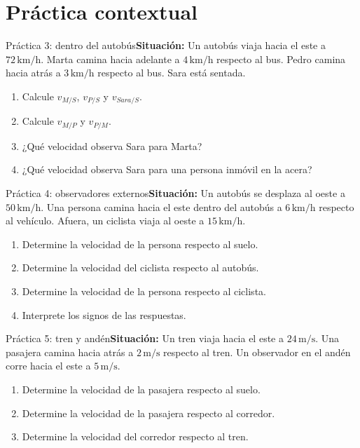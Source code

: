 \documentclass[aspectratio=169,10pt]{beamer}
\begin{document}
\section{Práctica contextual}
\begin{frame}{Práctica 3: dentro del autobús}\textbf{Situación:} Un autobús viaja hacia el este a $72\,\mathrm{km/h}$. Marta camina hacia adelante a $4\,\mathrm{km/h}$ respecto al bus. Pedro camina hacia atrás a $3\,\mathrm{km/h}$ respecto al bus. Sara está sentada.\begin{enumerate}\item Calcule $v_{M/S}$, $v_{P/S}$ y $v_{Sara/S}$.\item Calcule $v_{M/P}$ y $v_{P/M}$.\item ¿Qué velocidad observa Sara para Marta?\item ¿Qué velocidad observa Sara para una persona inmóvil en la acera?\end{enumerate}\end{frame}
\begin{frame}{Práctica 4: observadores externos}\textbf{Situación:} Un autobús se desplaza al oeste a $50\,\mathrm{km/h}$. Una persona camina hacia el este dentro del autobús a $6\,\mathrm{km/h}$ respecto al vehículo. Afuera, un ciclista viaja al oeste a $15\,\mathrm{km/h}$.\begin{enumerate}\item Determine la velocidad de la persona respecto al suelo.\item Determine la velocidad del ciclista respecto al autobús.\item Determine la velocidad de la persona respecto al ciclista.\item Interprete los signos de las respuestas.\end{enumerate}\end{frame}
\begin{frame}{Práctica 5: tren y andén}\textbf{Situación:} Un tren viaja hacia el este a $24\,\mathrm{m/s}$. Una pasajera camina hacia atrás a $2\,\mathrm{m/s}$ respecto al tren. Un observador en el andén corre hacia el este a $5\,\mathrm{m/s}$.\begin{enumerate}\item Determine la velocidad de la pasajera respecto al suelo.\item Determine la velocidad de la pasajera respecto al corredor.\item Determine la velocidad del corredor respecto al tren.\end{enumerate}\end{frame}
\end{document}
